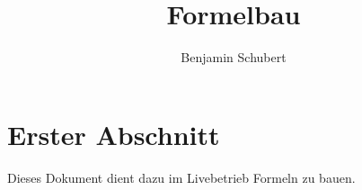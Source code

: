 \documentclass[11pt]{scrartcl}
\title{\textbf{Formelbau}}
\author{Benjamin Schubert}
\date{}
\begin{document}
\maketitle
\thispagestyle{empty}

\section{Erster Abschnitt}
Dieses Dokument dient dazu im Livebetrieb Formeln zu bauen.
\end{document}
